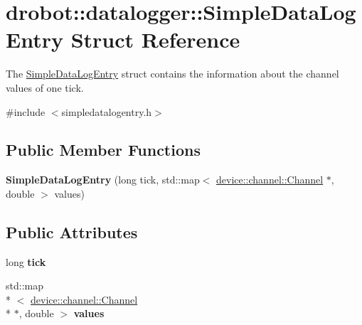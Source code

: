 \hypertarget{structdrobot_1_1datalogger_1_1SimpleDataLogEntry}{\section{drobot\-:\-:datalogger\-:\-:Simple\-Data\-Log\-Entry Struct Reference}
\label{structdrobot_1_1datalogger_1_1SimpleDataLogEntry}
}


The \hyperlink{structdrobot_1_1datalogger_1_1SimpleDataLogEntry}{Simple\-Data\-Log\-Entry} struct contains the information about the channel values of one tick.  




{\ttfamily \#include $<$simpledatalogentry.\-h$>$}

\subsection*{Public Member Functions}
\begin{DoxyCompactItemize}
\item 
\hypertarget{structdrobot_1_1datalogger_1_1SimpleDataLogEntry_ac325c619e0e882fd0079a8239c5008e3}{{\bfseries Simple\-Data\-Log\-Entry} (long tick, std\-::map$<$ \hyperlink{classdrobot_1_1device_1_1channel_1_1Channel}{device\-::channel\-::\-Channel} $\ast$, double $>$ values)}\label{structdrobot_1_1datalogger_1_1SimpleDataLogEntry_ac325c619e0e882fd0079a8239c5008e3}

\end{DoxyCompactItemize}
\subsection*{Public Attributes}
\begin{DoxyCompactItemize}
\item 
\hypertarget{structdrobot_1_1datalogger_1_1SimpleDataLogEntry_a62f1b2c6b5e5a0ff20ed0e114fdad05b}{long {\bfseries tick}}\label{structdrobot_1_1datalogger_1_1SimpleDataLogEntry_a62f1b2c6b5e5a0ff20ed0e114fdad05b}

\item 
\hypertarget{structdrobot_1_1datalogger_1_1SimpleDataLogEntry_ad1602a5bcaf5fb0f61e27fb3e13f6a6d}{std\-::map\\*
$<$ \hyperlink{classdrobot_1_1device_1_1channel_1_1Channel}{device\-::channel\-::\-Channel} \\*
$\ast$, double $>$ {\bfseries values}}\label{structdrobot_1_1datalogger_1_1SimpleDataLogEntry_ad1602a5bcaf5fb0f61e27fb3e13f6a6d}

\end{DoxyCompactItemize}


